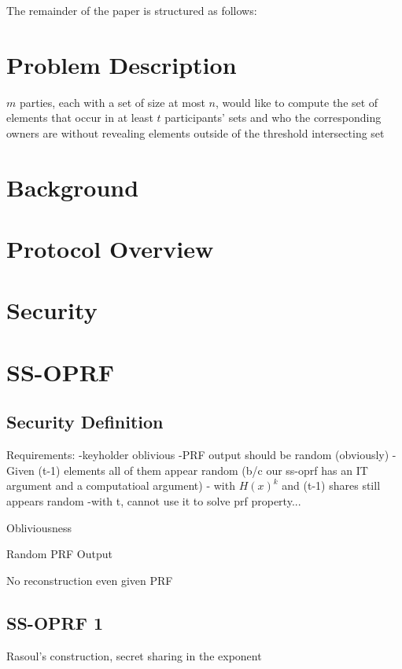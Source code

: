 \documentclass[10pt, sigconf]{acmart}
\begin{document}
The remainder of the paper is structured as follows:



\section{Problem Description}

$m$ parties, each with a set of size at most $n$, would like to compute the set of elements that occur in at least $t$ participants' sets and who the corresponding owners are without revealing elements outside of the threshold intersecting set


\section{Background}


\section{Protocol Overview}


\section{Security}



\section{SS-OPRF}

\subsection{Security Definition}


Requirements: 
-keyholder oblivious
-PRF output should be random (obviously)
- Given (t-1) elements all of them appear random (b/c our ss-oprf has an IT argument and a computatioal argument)
- with $H(x)^k$ and (t-1) shares still appears random 
-with t, cannot use it to solve prf property...


Obliviousness

Random PRF Output

No reconstruction even given PRF

\subsection{SS-OPRF 1}

Rasoul's construction, secret sharing in the exponent
\end{document}
